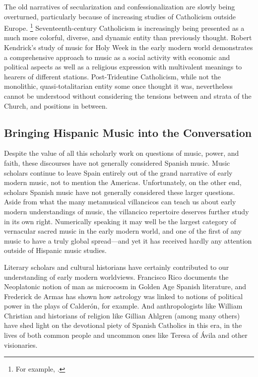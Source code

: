 The old narratives of secularization and confessionalization are slowly being overturned, particularly because of increasing studies of Catholicism outside Europe.%
	\footnote{%
	For example, \autocites{Bailey:Art}{Dean:Inka}{Ditchfield:Dancing}.
	}
Seventeenth-century Catholicism is increasingly being presented as a much more colorful, diverse, and dynamic entity than previously thought.
Robert Kendrick's study of music for Holy Week in the early modern world demonstrates a comprehensive approach to music as a social activity with economic and political aspects as well as a religious expression with multivalent meanings to hearers of different stations.
	\autocite{Kendrick:Jeremiah}
Post-Tridentine Catholicism, while not the monolithic, quasi-totalitarian entity some once thought it was, nevertheless cannot be understood without considering the tensions between  and  strata of the Church, and positions in between.

\subsection{%
Bringing Hispanic Music into the Conversation
}

Despite the value of all this scholarly work on questions of music, power, and faith, these discourses have not generally considered Spanish music. 
Music scholars continue to leave Spain entirely out of the grand narrative of early modern music, not to mention the Americas.
Unfortunately, on the other end, scholars Spanish music have not generally considered these larger questions.
Aside from what the many metamusical villancicos can teach us about early modern understandings of music, the villancico repertoire deserves further study in its own right. 
Numerically speaking it may well be the largest category of vernacular sacred music in the early modern world, and one of the first of any music to have a truly global spread---and yet it has received hardly any attention outside of Hispanic music studies.

Literary scholars and cultural historians have certainly contributed to our understanding of early modern worldviews. 
Francisco Rico documents the Neoplatonic notion of man as microcosm in Golden Age Spanish literature, and Frederick de Armas has shown how astrology was linked to notions of political power in the plays of Calderón, for example.%
	\autocites{Rico:PequenoMundo}{DeArmas:Astraea}
And anthropologists like William Christian and historians of religion like Gillian Ahlgren (among many others) have shed light on the devotional piety of Spanish Catholics in this era, in the lives of both common people and uncommon ones like Teresa of Ávila and other visionaries.%
	\autocites{Christian:LocalReligion}{Christian:PersonAndGod}{Ahlgren:TeresaPolitics}

